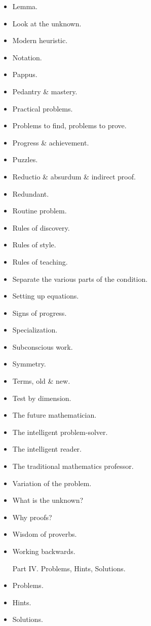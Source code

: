 \documentclass{article}
\begin{document}
\begin{enumerate}
\begin{itemize}
		\item {\sf Lemma.}
		\item {\sf Look at the unknown.}
		\item {\sf Modern heuristic.}
		\item {\sf Notation.}
		\item {\sf Pappus.}
		\item {\sf Pedantry \& mastery.}
		\item {\sf Practical problems.}
		\item {\sf Problems to find, problems to prove.}
		\item {\sf Progress \& achievement.}
		\item {\sf Puzzles.}
		\item {\sf Reductio \& absurdum \& indirect proof.}
		\item {\sf Redundant.}
		\item {\sf Routine problem.}
		\item {\sf Rules of discovery.}
		\item {\sf Rules of style.}
		\item {\sf Rules of teaching.}
		\item {\sf Separate the various parts of the condition.}
		\item {\sf Setting up equations.}
		\item {\sf Signs of progress.}
		\item {\sf Specialization.}
		\item {\sf Subconscious work.}
		\item {\sf Symmetry.}
		\item {\sf Terms, old \& new.}
		\item {\sf Test by dimension.}
		\item {\sf The future mathematician.}
		\item {\sf The intelligent problem-solver.}
		\item {\sf The intelligent reader.}
		\item {\sf The traditional mathematics professor.}
		\item {\sf Variation of the problem.}
		\item {\sf What is the unknown?}
		\item {\sf Why proofs?}
		\item {\sf Wisdom of proverbs.}
		\item {\sf Working backwards.}

		Part IV. Problems, Hints, Solutions.
		\item {\sf Problems.}
		\item {\sf Hints.}
		\item {\sf Solutions.}
	\end{itemize}


\end{enumerate}
\end{document}
